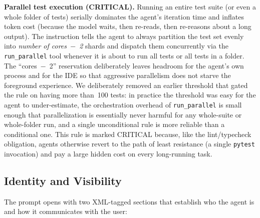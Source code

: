 \documentclass{article}
\begin{document}
\textbf{Parallel test execution (CRITICAL).}  Running an entire test suite (or even a whole folder of tests) serially dominates the agent's iteration time and inflates token cost (because the model waits, then re-reads, then re-reasons about a long output).  The instruction tells the agent to always partition the test set evenly into \emph{number of cores~\(-\)~2} shards and dispatch them concurrently via the \texttt{run\_parallel} tool whenever it is about to run all tests or all tests in a folder.  The ``cores~\(-\)~2'' reservation deliberately leaves headroom for the agent's own process and for the IDE so that aggressive parallelism does not starve the foreground experience.  We deliberately removed an earlier threshold that gated the rule on having more than~100 tests: in practice the threshold was easy for the agent to under-estimate, the orchestration overhead of \texttt{run\_parallel} is small enough that parallelization is essentially never harmful for any whole-suite or whole-folder run, and a single unconditional rule is more reliable than a conditional one.  This rule is marked CRITICAL because, like the lint/typecheck obligation, agents otherwise revert to the path of least resistance (a single \texttt{pytest} invocation) and pay a large hidden cost on every long-running task.

\subsection{Identity and Visibility}

The prompt opens with two XML-tagged sections that establish who the agent is and how it communicates with the user:
\end{document}
